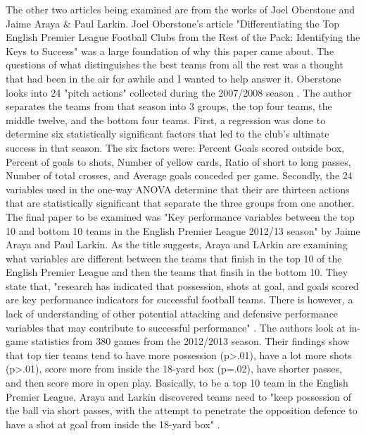 \documentclass[12pt,english]{article}
\begin{document}
\begin{Literature Review}
\begin{doublespace}
\indent The other two articles being examined are from the works of Joel Oberstone and Jaime Araya & Paul Larkin. Joel Oberstone's article "Differentiating the Top English Premier League Football Clubs from the Rest of the Pack: Identifying the Keys to Success" was a large foundation of why this paper came about. The questions of what distinguishes the best teams from all the rest was a thought that had been in the air for awhile and I wanted to help answer it. Oberstone looks into 24 "pitch actions" collected during the 2007/2008 season \citep{oberstone}. The author separates the teams from that season into 3 groups, the top four teams, the middle twelve, and the bottom four teams. First, a regression was done to determine six statistically significant factors that led to the club's ultimate success in that season. The six factors were: Percent Goals scored outside box, Percent of goals to shots, Number of yellow cards, Ratio of short to long passes, Number of total crosses, and Average goals conceded per game. Secondly, the 24 variables used in the one-way ANOVA determine that their are thirteen actions that are statistically significant that separate the three groups from one another.\\
\indent The final paper to be examined was "Key performance variables between the top 10 and bottom 10 teams in the English Premier League 2012/13 season" by Jaime Araya and Paul Larkin. As the title suggests, Araya and LArkin are examining what variables are different between the teams that finish in the top 10 of the English Premier League and then the teams that finsih in the bottom 10. They state that, "research has indicated that possession, shots at goal, and goals scored are key performance indicators for successful football teams. There is however, a lack of understanding of other potential attacking and defensive performance variables that may contribute to successful performance" \citep{araya}. The authors look at in-game statistics from 380 games from the 2012/2013 season. Their findings show that top tier teams tend to have more possession (p>.01), have a lot more shots (p>.01), score more from inside the 18-yard box (p=.02), have shorter passes, and then score more in open play. Basically, to be a top 10 team in the English Premier League, Araya and Larkin discovered teams need to "keep possession of the ball via short passes, with the attempt to penetrate the opposition defence to have a shot at goal from inside the 18-yard box" \citep{araya}.

\end{doublespace}
\end{Literature Review}
\end{document}
